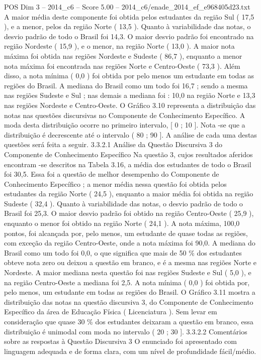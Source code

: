 \begin{textsample}{POS Dim 3 – 2014\_c6 – Score 5.00 – 2014\_c6/enade\_2014\_ef\_e968405d23.txt}
A maior média deste componente foi obtida pelos estudantes da região Sul ( 17,5 ), e a menor, pelos da região Norte ( 13,5 ).
Quanto à variabilidade das notas, o desvio padrão de todo o Brasil foi 14,3.
O maior desvio padrão foi encontrado na região Nordeste ( 15,9 ), e o menor, na região Norte ( 13,0 ).
A maior nota máxima foi obtida nas regiões Nordeste e Sudeste ( 86,7 ), enquanto a menor nota máxima foi encontrada nas regiões Norte e Centro-Oeste ( 73,3 ).
Além disso, a nota mínima ( 0,0 ) foi obtida por pelo menos um estudante em todas as regiões do Brasil.
A mediana do Brasil como um todo foi 16,7 ; sendo a mesma nas regiões Sudeste e Sul ; nas demais a mediana foi : 10,0 na região Norte e 13,3 nas regiões Nordeste e Centro-Oeste.
O Gráfico 3.10 representa a distribuição das notas nas questões discursivas no Componente de Conhecimento Específico.
A moda desta distribuição ocorre no primeiro intervalo, [ 0 ; 10 ].
Nota -se que a distribuição é decrescente até o intervalo ( 80 ; 90 ].
A análise de cada uma destas questões será feita a seguir. 3.3.2.1 Análise da Questão Discursiva 3 do Componente de Conhecimento Específico Na questão 3, cujos resultados aferidos encontram -se descritos na Tabela 3.16, a média dos estudantes de todo o Brasil foi 30,5.
Essa foi a questão de melhor desempenho do Componente de Conhecimento Específico ; a menor média nessa questão foi obtida pelos estudantes da região Norte ( 24,5 ), enquanto a maior média foi obtida na região Sudeste ( 32,4 ).
Quanto à variabilidade das notas, o desvio padrão de todo o Brasil foi 25,3.
O maior desvio padrão foi obtido na região Centro-Oeste ( 25,9 ), enquanto o menor foi obtido na região Norte ( 24,1 ).
A nota máxima, 100,0 pontos, foi alcançada por, pelo menos, um estudante de quase todas as regiões, com exceção da região Centro-Oeste, onde a nota máxima foi 90,0.
A mediana do Brasil como um todo foi 0,0, o que significa que mais de 50 \% dos estudantes obteve nota zero ou deixou a questão em branco, e é a mesma nas regiões Norte e Nordeste.
A maior mediana nesta questão foi nas regiões Sudeste e Sul ( 5,0 ), e na região Centro-Oeste a mediana foi 2,5.
A nota mínima ( 0,0 ) foi obtida por, pelo menos, um estudante em todas as regiões do Brasil.
O Gráfico 3.11 mostra a distribuição das notas na questão discursiva 3, do Componente de Conhecimento Específico da área de Educação Física ( Licenciatura ).
Sem levar em consideração que quase 30 \% dos estudantes deixaram a questão em branco, essa distribuição é unimodal com moda no intervalo ( 20 ; 30 ]. 3.3.2.2 Comentários sobre as respostas à Questão Discursiva 3 O enunciado foi apresentado com linguagem adequada e de forma clara, com um nível de profundidade fácil/médio.

\end{textsample}
